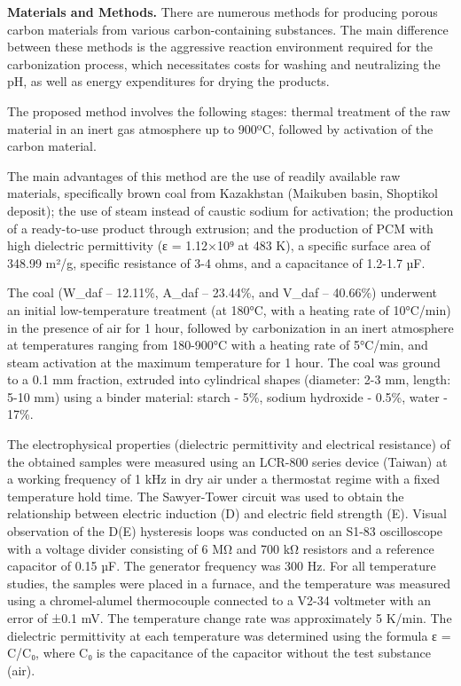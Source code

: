 \textbf{Materials and Methods.} There are numerous methods for producing
porous carbon materials from various carbon-containing substances. The
main difference between these methods is the aggressive reaction
environment required for the carbonization process, which necessitates
costs for washing and neutralizing the pH, as well as energy
expenditures for drying the products.

The proposed method involves the following stages: thermal treatment of
the raw material in an inert gas atmosphere up to 900ºC, followed by
activation of the carbon material.

The main advantages of this method are the use of readily available raw
materials, specifically brown coal from Kazakhstan (Maikuben basin,
Shoptikol deposit); the use of steam instead of caustic sodium for
activation; the production of a ready-to-use product through extrusion;
and the production of PCM with high dielectric permittivity (ε =
1.12×10⁹ at 483 K), a specific surface area of 348.99 m²/g, specific
resistance of 3-4 ohms, and a capacitance of 1.2-1.7 µF.

The coal (W\_daf -- 12.11\%, A\_daf -- 23.44\%, and V\_daf -- 40.66\%)
underwent an initial low-temperature treatment (at 180°C, with a heating
rate of 10°C/min) in the presence of air for 1 hour, followed by
carbonization in an inert atmosphere at temperatures ranging from
180-900°C with a heating rate of 5°C/min, and steam activation at the
maximum temperature for 1 hour. The coal was ground to a 0.1 mm
fraction, extruded into cylindrical shapes (diameter: 2-3 mm, length:
5-10 mm) using a binder material: starch - 5\%, sodium hydroxide -
0.5\%, water - 17\%.

The electrophysical properties (dielectric permittivity and electrical
resistance) of the obtained samples were measured using an LCR-800
series device (Taiwan) at a working frequency of 1 kHz in dry air under
a thermostat regime with a fixed temperature hold time. The Sawyer-Tower
circuit was used to obtain the relationship between electric induction
(D) and electric field strength (E). Visual observation of the D(E)
hysteresis loops was conducted on an S1-83 oscilloscope with a voltage
divider consisting of 6 MΩ and 700 kΩ resistors and a reference
capacitor of 0.15 µF. The generator frequency was 300 Hz. For all
temperature studies, the samples were placed in a furnace, and the
temperature was measured using a chromel-alumel thermocouple connected
to a V2-34 voltmeter with an error of ±0.1 mV. The temperature change
rate was approximately 5 K/min. The dielectric permittivity at each
temperature was determined using the formula ε = C/C₀, where C₀ is the
capacitance of the capacitor without the test substance (air).

